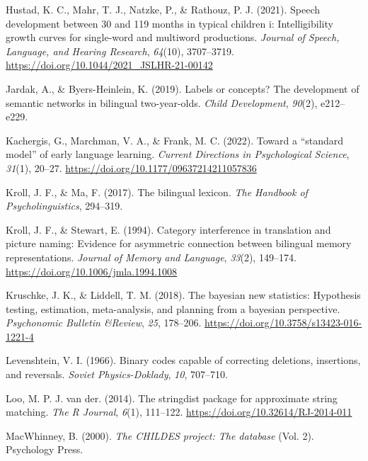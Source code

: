 \documentclass[
]{article}
\newlength{\cslhangindent}
\newlength{\cslentryspacingunit} %
\newenvironment{CSLReferences}[2] %
 {%
  \setlength{\parindent}{0pt}
  \ifodd #1
  \let\oldpar\par
  \def\par{\hangindent=\cslhangindent\oldpar}
  \fi
  \setlength{\parskip}{#2\cslentryspacingunit}
 }%
 {}
\begin{document}
\begin{CSLReferences}{1}{0}
\leavevmode{}%
Hustad, K. C., Mahr, T. J., Natzke, P., \& Rathouz, P. J. (2021). Speech
development between 30 and 119 months in typical children i:
Intelligibility growth curves for single-word and multiword productions.
\emph{Journal of Speech, Language, and Hearing Research}, \emph{64}(10),
3707--3719. \url{https://doi.org/10.1044/2021_JSLHR-21-00142}

\leavevmode{}%
Jardak, A., \& Byers-Heinlein, K. (2019). Labels or concepts? The
development of semantic networks in bilingual two-year-olds. \emph{Child
Development}, \emph{90}(2), e212--e229.

\leavevmode{}%
Kachergis, G., Marchman, V. A., \& Frank, M. C. (2022). Toward a
{``standard model''} of early language learning. \emph{Current
Directions in Psychological Science}, \emph{31}(1), 20--27.
\url{https://doi.org/10.1177/09637214211057836}

\leavevmode{}%
Kroll, J. F., \& Ma, F. (2017). The bilingual lexicon. \emph{The
Handbook of Psycholinguistics}, 294--319.

\leavevmode{}%
Kroll, J. F., \& Stewart, E. (1994). Category interference in
translation and picture naming: Evidence for asymmetric connection
between bilingual memory representations. \emph{Journal of Memory and
Language}, \emph{33}(2), 149--174.
\url{https://doi.org/10.1006/jmla.1994.1008}

\leavevmode{}%
Kruschke, J. K., \& Liddell, T. M. (2018). The bayesian new statistics:
Hypothesis testing, estimation, meta-analysis, and planning from a
bayesian perspective. \emph{Psychonomic Bulletin \&Review}, \emph{25},
178--206. \url{https://doi.org/10.3758/s13423-016-1221-4}

\leavevmode{}%
Levenshtein, V. I. (1966). Binary codes capable of correcting deletions,
insertions, and reversals. \emph{Soviet Physics-Doklady}, \emph{10},
707--710.

\leavevmode{}%
Loo, M. P. J. van der. (2014). The stringdist package for approximate
string matching. \emph{The R Journal}, \emph{6}(1), 111--122.
\url{https://doi.org/10.32614/RJ-2014-011}

\leavevmode{}%
MacWhinney, B. (2000). \emph{The {CHILDES} project: The database} (Vol.
2). Psychology Press.


\end{CSLReferences}
\end{document}
